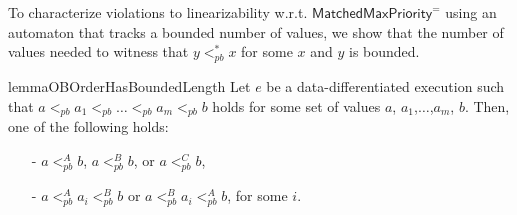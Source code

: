 %
%

To characterize violations to linearizability w.r.t. $\mathsf{MatchedMaxPriority}^{=}$ using an automaton that tracks a bounded number of values, we show that the number of values needed to witness that $y <_{\textit{pb}}^* x$ for some $x$ and $y$ is bounded.
%
%

\begin{restatable}{lemma}{OBOrderHasBoundedLength}
\label{lemma:ob order has bounded length}
Let $e$ be a data-differentiated execution such that $a <_{\textit{pb}} a_1 <_{\textit{pb}} \ldots <_{\textit{pb}} a_m <_{\textit{pb}} b$ holds for some set of values $a$, $a_1$,$\ldots$,$a_m$, $b$. Then, one of the following holds:
\begin{itemize}
\setlength{\itemsep}{0.5pt}
\item[-] $a <_{\textit{pb}}^A b$, $a <_{\textit{pb}}^B b$, or $a <_{\textit{pb}}^C b$,

\item[-] $a <_{\textit{pb}}^A a_i <_{\textit{pb}}^B b$ or $a <_{\textit{pb}}^B a_i <_{\textit{pb}}^A b$, for some $i$.
\end{itemize}
\end{restatable}

